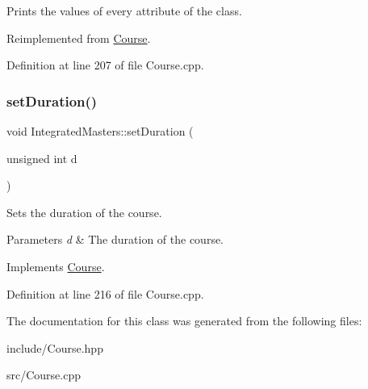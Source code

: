 Prints the values of every attribute of the class. 

Reimplemented from \hyperlink{classCourse_a3248ecd5df196cf50ce379ec37758c59}{Course}.



Definition at line 207 of file Course.\+cpp.

\mbox{\label{classIntegratedMasters_a7be9fb139aef4a5b839bb6879de8cddb}} 
\subsubsection{\texorpdfstring{set\+Duration()}{setDuration()}}
{\footnotesize\ttfamily void Integrated\+Masters\+::set\+Duration (\begin{DoxyParamCaption}\item[{unsigned int}]{d }\end{DoxyParamCaption})\hspace{0.3cm}{\ttfamily [virtual]}}

Sets the duration of the course. 
\begin{DoxyParams}{Parameters}
{\em d} & The duration of the course. \\
\hline
\end{DoxyParams}


Implements \hyperlink{classCourse}{Course}.



Definition at line 216 of file Course.\+cpp.



The documentation for this class was generated from the following files\+:\begin{DoxyCompactItemize}
\item 
include/Course.\+hpp\item 
src/Course.\+cpp\end{DoxyCompactItemize}
